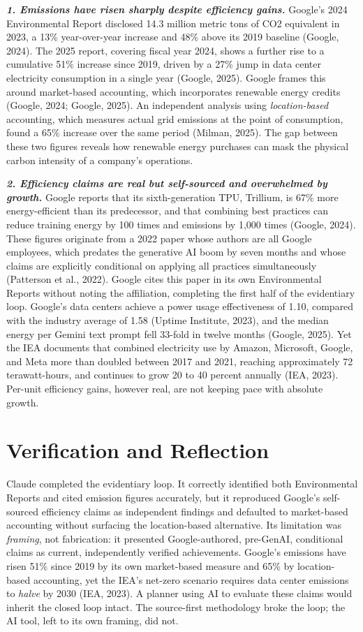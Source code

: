 \documentclass[11pt, twocolumn]{article}
\begin{document}
\textbf{\textit{1. Emissions have risen sharply despite efficiency gains.}}
Google's 2024 Environmental Report disclosed 14.3 million metric tons of CO2 equivalent in 2023, a 13\% year-over-year increase and 48\% above its 2019 baseline (Google, 2024). The 2025 report, covering fiscal year 2024, shows a further rise to a cumulative 51\% increase since 2019, driven by a 27\% jump in data center electricity consumption in a single year (Google, 2025). Google frames this around market-based accounting, which incorporates renewable energy credits (Google, 2024; Google, 2025). An independent analysis using \textit{location-based} accounting, which measures actual grid emissions at the point of consumption, found a 65\% increase over the same period (Milman, 2025). The gap between these two figures reveals how renewable energy purchases can mask the physical carbon intensity of a company's operations.

\textbf{\textit{2. Efficiency claims are real but self-sourced and overwhelmed by growth.}}
Google reports that its sixth-generation TPU, Trillium, is 67\% more energy-efficient than its predecessor, and that combining best practices can reduce training energy by 100 times and emissions by 1,000 times (Google, 2024). These figures originate from a 2022 paper whose authors are all Google employees, which predates the generative AI boom by seven months and whose claims are explicitly conditional on applying all practices simultaneously (Patterson et al., 2022). Google cites this paper in its own Environmental Reports without noting the affiliation, completing the first half of the evidentiary loop. Google's data centers achieve a power usage effectiveness of 1.10, compared with the industry average of 1.58 (Uptime Institute, 2023), and the median energy per Gemini text prompt fell 33-fold in twelve months (Google, 2025). Yet the IEA documents that combined electricity use by Amazon, Microsoft, Google, and Meta more than doubled between 2017 and 2021, reaching approximately 72 terawatt-hours, and continues to grow 20 to 40 percent annually (IEA, 2023). Per-unit efficiency gains, however real, are not keeping pace with absolute growth.

\section*{Verification and Reflection}
Claude completed the evidentiary loop. It correctly identified both Environmental Reports and cited emission figures accurately, but it reproduced Google's self-sourced efficiency claims as independent findings and defaulted to market-based accounting without surfacing the location-based alternative. Its limitation was \textit{framing}, not fabrication: it presented Google-authored, pre-GenAI, conditional claims as current, independently verified achievements. Google's emissions have risen 51\% since 2019 by its own market-based measure and 65\% by location-based accounting, yet the IEA's net-zero scenario requires data center emissions to \textit{halve} by 2030 (IEA, 2023). A planner using AI to evaluate these claims would inherit the closed loop intact. The source-first methodology broke the loop; the AI tool, left to its own framing, did not.
\end{document}
